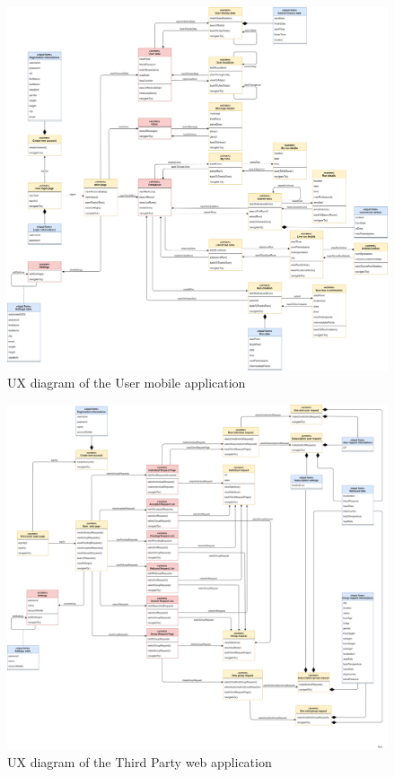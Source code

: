 \begin{figure}[H]
    \centering
    \includegraphics[width=1\textwidth]{./Pictures/UXMobile.png}
    \caption{UX diagram of the User mobile application}
\end{figure}

\begin{figure}[H]
    \centering
    \includegraphics[width=1\textwidth]{./Pictures/UXWeb.png}
    \caption{UX diagram of the Third Party web application}
\end{figure}

